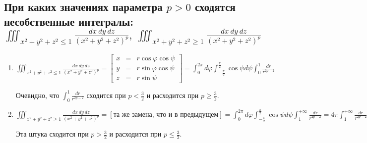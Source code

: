 
\subsection{При каких значениях параметра $p > 0$ сходятся несобственные интегралы: \\ $\iiint_{x^2 + y^2 + z^2 \leqslant 1}\frac{dx~dy~dz}{(x^2+y^2+z^2)^p}, ~ \iiint_{x^2+y^2+z^2 \geqslant 1} \frac{dx~dy~dz}{(x^2+y^2+z^2)^p}$}
\begin{enumerate}
    \item $\iiint_{x^2 + y^2 + z^2 \leqslant 1}\frac{dx~dy~dz}{(x^2+y^2+z^2)^p} = 
    \begin{bmatrix}
        x &=& r\cos \varphi \cos \psi \\
        y &=& r \sin \varphi \cos \psi \\
        z &=& r \sin \psi
    \end{bmatrix} = 
    \int_0^{2\pi} d\varphi \int_{-\frac{\pi}{2}}^{\frac{\pi}{2}}\cos \psi d\psi
    \int_0^1 \frac{dr}{r^{2p-2}}$

    Очевидно, что $\int_0^1\frac{dr}{r^{2p-2}}$ сходится при $p < \frac{3}{2}$ и расходится при $p \geqslant \frac{3}{2}$.

    \item $\iiint_{x^2+y^2+z^2 \geqslant 1} \frac{dx~dy~dz}{(x^2+y^2+z^2)^p} =
    [\text{та же замена, что и в предыдущем}] =
    \int_0^{2\pi} d\varphi \int_{-\frac{\pi}{2}}^{\frac{\pi}{2}}\cos \psi d\psi \int_1^{+\infty}\frac{dr}{r^{2p-2}} =
    4\pi \int_1^{+\infty}\frac{dr}{r^{2p - 2}}$

    Эта штука сходится при $p > \frac{3}{2}$ и расходится при $p \leqslant \frac{3}{2}$.
\end{enumerate}
